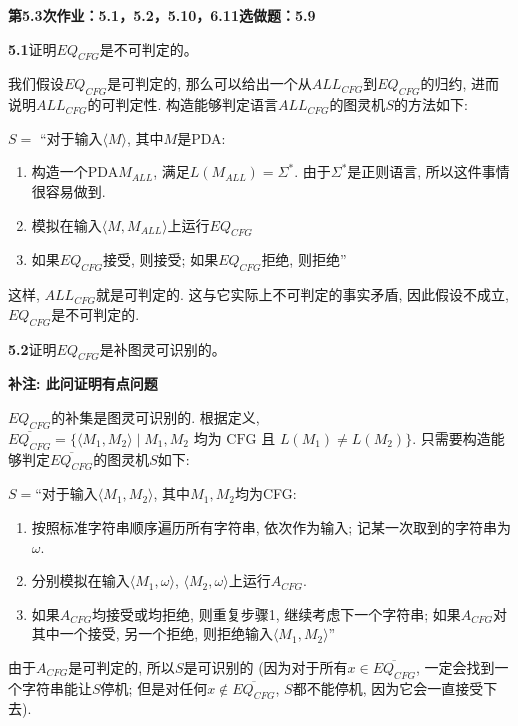 \documentclass[UTF8]{report}
\newcommand{\problem}[1]{{\setlength{\parskip}{10pt}\noindent \bf{#1}}}
\newenvironment{solution}{{\noindent\hskip 2em \bf 解 \quad}}{}
\begin{document}
\textbf{第5.3次作业：5.1，5.2，5.10，6.11选做题：5.9}

\problem{5.1}证明$EQ_{CFG}$是不可判定的。

\begin{solution}
    我们假设$EQ_{CFG}$是可判定的, 那么可以给出一个从$ALL_{CFG}$到$EQ_{CFG}$的归约, 进而说明$ALL_{CFG}$的可判定性. 构造能够判定语言$ALL_{CFG}$的图灵机$S$的方法如下:

    $S =$ ``对于输入$\langle M \rangle$, 其中$M$是PDA:
    \begin{enumerate}
        \item 构造一个PDA$M_{ALL}$, 满足$L(M_{ALL}) = \Sigma^*$. 由于$\Sigma^*$是正则语言, 所以这件事情很容易做到.
        \item 模拟在输入$\langle M, M_{ALL} \rangle$上运行$EQ_{CFG}$
        \item 如果$EQ_{CFG}$接受, 则接受; 如果$EQ_{CFG}$拒绝, 则拒绝''
    \end{enumerate}

    这样, $ALL_{CFG}$就是可判定的. 这与它实际上不可判定的事实矛盾, 因此假设不成立, $EQ_{CFG}$是不可判定的.
\end{solution}



\problem{5.2}证明$EQ_{CFG}$是补图灵可识别的。

\begin{solution}
    \textbf{补注: 此问证明有点问题}

    $EQ_{CFG}$的补集是图灵可识别的. 根据定义, $\overline{EQ_{CFG}} = \{ \langle M_1, M_2 \rangle \mid M_1, M_2 \text{ 均为 CFG 且 } L(M_1) \neq L(M_2) \}$. 只需要构造能够判定$\overline{EQ_{CFG}}$的图灵机$S$如下:

    $S=$``对于输入$\langle M_1, M_2 \rangle$, 其中$M_1, M_2$均为CFG:
    \begin{enumerate}
        \item 按照标准字符串顺序遍历所有字符串, 依次作为输入; 记某一次取到的字符串为$\omega$.
        \item 分别模拟在输入$\langle M_1, \omega \rangle$, $\langle M_2, \omega \rangle$上运行$A_{CFG}$.
        \item 如果$A_{CFG}$均接受或均拒绝, 则重复步骤1, 继续考虑下一个字符串; 如果$A_{CFG}$对其中一个接受, 另一个拒绝, 则拒绝输入$\langle M_1, M_2 \rangle$''
    \end{enumerate}

    由于$A_{CFG}$是可判定的, 所以$S$是可识别的 (因为对于所有$x \in \overline{EQ_{CFG}}$, 一定会找到一个字符串能让$S$停机; 但是对任何$x \notin \overline{EQ_{CFG}}$, $S$都不能停机, 因为它会一直接受下去).
\end{solution}
\end{document}
